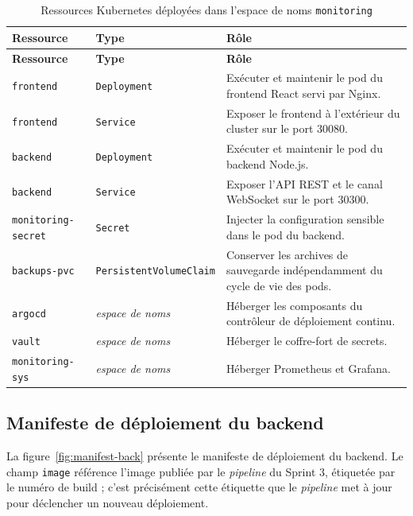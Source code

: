 \renewcommand{\arraystretch}{1.3}
\small
\begin{longtable}{|>{\raggedright\arraybackslash}p{3.4cm}
                  |>{\raggedright\arraybackslash}p{3.0cm}
                  |>{\raggedright\arraybackslash}p{7.0cm}|}
\hline
\textbf{Ressource} & \textbf{Type} & \textbf{Rôle} \\
\hline
\endfirsthead

\hline
\textbf{Ressource} & \textbf{Type} & \textbf{Rôle} \\
\hline
\endhead

\hline
\caption{Ressources Kubernetes déployées dans l'espace de noms \texttt{monitoring}}
\label{tab:k8s-res}
\endlastfoot

\texttt{frontend} & \texttt{Deployment} & Exécuter et maintenir le pod du frontend React servi par Nginx. \\
\hline
\texttt{frontend} & \texttt{Service} & Exposer le frontend à l'extérieur du cluster sur le port 30080. \\
\hline
\texttt{backend} & \texttt{Deployment} & Exécuter et maintenir le pod du backend Node.js. \\
\hline
\texttt{backend} & \texttt{Service} & Exposer l'API REST et le canal WebSocket sur le port 30300. \\
\hline
\texttt{monitoring-secret} & \texttt{Secret} & Injecter la configuration sensible dans le pod du backend. \\
\hline
\texttt{backups-pvc} & \texttt{Persistent}\allowbreak\texttt{VolumeClaim} & Conserver les archives de sauvegarde indépendamment du cycle de vie des pods. \\
\hline
\texttt{argocd} & \textit{espace de noms} & Héberger les composants du contrôleur de déploiement continu. \\
\hline
\texttt{vault} & \textit{espace de noms} & Héberger le coffre-fort de secrets. \\
\hline
\texttt{monitoring-sys} & \textit{espace de noms} & Héberger Prometheus et Grafana. \\
\hline

\end{longtable}
\normalsize

\subsection{Manifeste de déploiement du backend}
La figure~\ref{fig:manifest-back} présente le manifeste de déploiement du backend. Le
champ \texttt{image} référence l'image publiée par le \textit{pipeline} du Sprint 3,
étiquetée par le numéro de build ; c'est précisément cette étiquette que le
\textit{pipeline} met à jour pour déclencher un nouveau déploiement.

